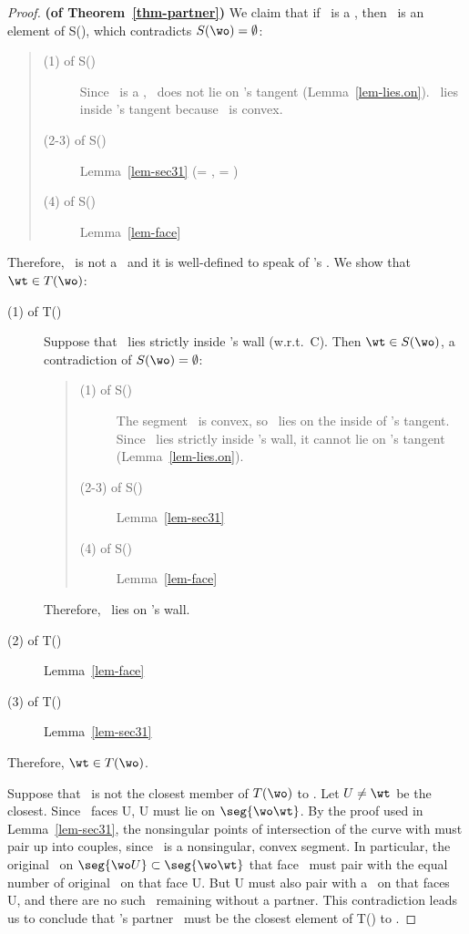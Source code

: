 \begin{proof}{\bf (of Theorem~\ref{thm-partner})  }
We claim that if \wo\ is a \pseudo, then \wt\ is an element of S(\wo), 
which contradicts $S(\wo) = \emptyset$:
\begin{quote}
\begin{description}
\item[(1) of S(\wo)] Since \wo\ is a \pseudo, \wt\ does not lie on \wo's tangent 
(Lemma~\ref{lem-lies.on}). \wt\ lies inside \wo's tangent because \wwa\
is convex.
\item[(2-3) of S(\wo)] Lemma~\ref{lem-sec31} (\x = \wo, \y = \wt)
\item[(4) of S(\wo)] Lemma~\ref{lem-face}
\end{description}
\end{quote}
Therefore, \wo\ is not a \pseudo\ and it is 
well-defined to speak of \wo's \cellsegment.
We show that $\wt \in T(\wo)$:\nopagebreak
\begin{description}
   \item[(1) of T(\wo)] Suppose 
that \wt\ lies strictly inside \wo's wall (w.r.t.\ C).
Then $\wt \in S(\wo)$, a contradiction of $S(\wo) = \emptyset$:\nopagebreak
\begin{quote}
\begin{description}
\item[(1) of S(\wo)] The segment \wwa\ is convex, so \wt\ lies on the inside of \wo's 
tangent.
Since \wt\ lies strictly inside \wo's wall, it cannot lie
on \wo's tangent (Lemma~\ref{lem-lies.on}).
\item[(2-3) of S(\wo)] Lemma~\ref{lem-sec31}
\item[(4) of S(\wo)] Lemma~\ref{lem-face}
\end{description}
\end{quote}
Therefore, \wt\ lies on \wo's wall.
   \item[(2) of T(\wo)] Lemma~\ref{lem-face}
   \item[(3) of T(\wo)] Lemma~\ref{lem-sec31}
\end{description}
Therefore, $\wt \in T(\wo)$.

Suppose that \wt\ is not the closest
member of $T(\wo)$ to \wo.
Let \mbox{$U \neq \wt$} be the closest.
Since \wo\ faces U, U must lie on $\seg{\wo\wt}$.
By the proof used in Lemma~\ref{lem-sec31}, the nonsingular points of 
intersection of the curve with \seg{\wo\wt} must pair up into couples,
since \wwa\ is a nonsingular, convex segment.
In particular, the original \wallpoints\ on 
$\seg{\wo U} \subset \seg{\wo\wt}$ that face \wo\ must pair
with the equal number of original \wallpoints\ on  that face U.
But U must also pair with a \wallpoint\ on \seg{\wo U} that faces U,
and there are no such \wallpoints\ remaining without a partner.
This contradiction leads us to conclude that
\wo's partner \wt\ must be the closest element of T(\wo) to \wo.
\end{proof}
%


